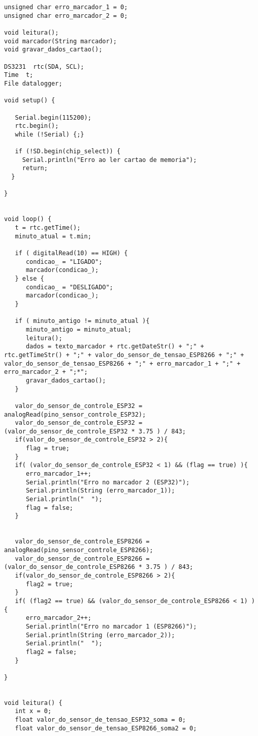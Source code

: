 \begin{lstlisting}
unsigned char erro_marcador_1 = 0;
unsigned char erro_marcador_2 = 0;

void leitura();
void marcador(String marcador);
void gravar_dados_cartao();

DS3231  rtc(SDA, SCL);
Time  t;
File datalogger;

void setup() {
  
   Serial.begin(115200);
   rtc.begin();
   while (!Serial) {;}
   
   if (!SD.begin(chip_select)) {
     Serial.println("Erro ao ler cartao de memoria");
     return;
  }
  
}


void loop() {
   t = rtc.getTime();
   minuto_atual = t.min;
   
   if ( digitalRead(10) == HIGH) {
      condicao_ = "LIGADO";
      marcador(condicao_);
   } else {
      condicao_ = "DESLIGADO";
      marcador(condicao_);
   }
   
   if ( minuto_antigo != minuto_atual ){  
      minuto_antigo = minuto_atual;
      leitura();
      dados = texto_marcador + rtc.getDateStr() + ";" + rtc.getTimeStr() + ";" + valor_do_sensor_de_tensao_ESP8266 + ";" + valor_do_sensor_de_tensao_ESP8266 + ";" + erro_marcador_1 + ";" + erro_marcador_2 + ";*";
      gravar_dados_cartao();
   }

   valor_do_sensor_de_controle_ESP32 = analogRead(pino_sensor_controle_ESP32);
   valor_do_sensor_de_controle_ESP32 =(valor_do_sensor_de_controle_ESP32 * 3.75 ) / 843;
   if(valor_do_sensor_de_controle_ESP32 > 2){
      flag = true;
   }
   if( (valor_do_sensor_de_controle_ESP32 < 1) && (flag == true) ){
      erro_marcador_1++;
      Serial.println("Erro no marcador 2 (ESP32)");
      Serial.println(String (erro_marcador_1));
      Serial.println("  ");
      flag = false;
   }


   valor_do_sensor_de_controle_ESP8266 = analogRead(pino_sensor_controle_ESP8266);
   valor_do_sensor_de_controle_ESP8266 =(valor_do_sensor_de_controle_ESP8266 * 3.75 ) / 843;
   if(valor_do_sensor_de_controle_ESP8266 > 2){
      flag2 = true;
   }
   if( (flag2 == true) && (valor_do_sensor_de_controle_ESP8266 < 1) ) {
      erro_marcador_2++;
      Serial.println("Erro no marcador 1 (ESP8266)");
      Serial.println(String (erro_marcador_2));
      Serial.println("  ");
      flag2 = false;
   }
   
}


void leitura() {
   int x = 0;
   float valor_do_sensor_de_tensao_ESP32_soma = 0;
   float valor_do_sensor_de_tensao_ESP8266_soma2 = 0;
  

\end{lstlisting}
